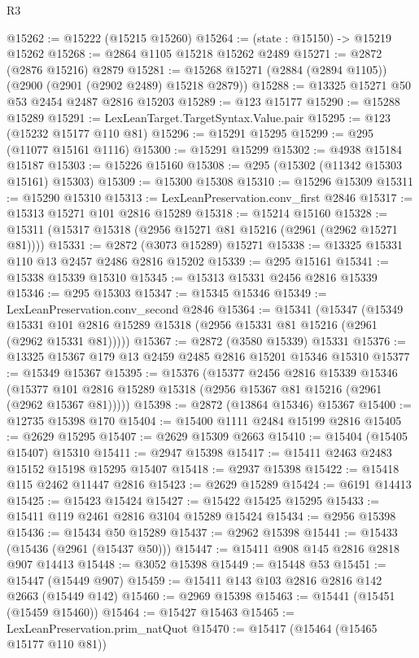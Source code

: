 \begin{lexlean}{R3}
\begin{coremodule}
@15262 := @15222 (@15215 @15260)
@15264 := (state : @15150) -> @15219 @15262
@15268 := @2864 @1105 @15218 @15262 @2489
@15271 := @2872 (@2876 @15216) @2879
@15281 := @15268 @15271 (@2884 (@2894 @1105)) (@2900 (@2901 (@2902 @2489) @15218 @2879))
@15288 := @13325 @15271 @50 @53 @2454 @2487 @2816 @15203
@15289 := @123 @15177
@15290 := @15288 @15289
@15291 := LexLeanTarget.TargetSyntax.Value.pair
@15295 := @123 (@15232 @15177 @110 @81)
@15296 := @15291 @15295
@15299 := @295 (@11077 @15161 @1116)
@15300 := @15291 @15299
@15302 := @4938 @15184 @15187
@15303 := @15226 @15160
@15308 := @295 (@15302 (@11342 @15303 @15161) @15303)
@15309 := @15300 @15308
@15310 := @15296 @15309
@15311 := @15290 @15310
@15313 := LexLeanPreservation.conv_first @2846
@15317 := @15313 @15271 @101 @2816 @15289
@15318 := @15214 @15160
@15328 := @15311 (@15317 @15318 (@2956 @15271 @81 @15216 (@2961 (@2962 @15271 @81))))
@15331 := @2872 (@3073 @15289) @15271
@15338 := @13325 @15331 @110 @13 @2457 @2486 @2816 @15202
@15339 := @295 @15161
@15341 := @15338 @15339 @15310
@15345 := @15313 @15331 @2456 @2816 @15339
@15346 := @295 @15303
@15347 := @15345 @15346
@15349 := LexLeanPreservation.conv_second @2846
@15364 := @15341
    (@15347
      (@15349 @15331 @101 @2816 @15289 @15318 (@2956 @15331 @81 @15216 (@2961 (@2962 @15331 @81)))))
@15367 := @2872 (@3580 @15339) @15331
@15376 := @13325 @15367 @179 @13 @2459 @2485 @2816 @15201 @15346 @15310
@15377 := @15349 @15367
@15395 := @15376
    (@15377
      @2456
      @2816
      @15339
      @15346
      (@15377 @101 @2816 @15289 @15318 (@2956 @15367 @81 @15216 (@2961 (@2962 @15367 @81)))))
@15398 := @2872 (@13864 @15346) @15367
@15400 := @12735 @15398 @170
@15404 := @15400 @1111 @2484 @15199 @2816
@15405 := @2629 @15295
@15407 := @2629 @15309 @2663
@15410 := @15404 (@15405 @15407) @15310
@15411 := @2947 @15398
@15417 := @15411 @2463 @2483 @15152 @15198 @15295 @15407
@15418 := @2937 @15398
@15422 := @15418 @115 @2462 @11447 @2816
@15423 := @2629 @15289
@15424 := @6191 @14413
@15425 := @15423 @15424
@15427 := @15422 @15425 @15295
@15433 := @15411 @119 @2461 @2816 @3104 @15289 @15424
@15434 := @2956 @15398
@15436 := @15434 @50 @15289
@15437 := @2962 @15398
@15441 := @15433 (@15436 (@2961 (@15437 @50)))
@15447 := @15411 @908 @145 @2816 @2818 @907 @14413
@15448 := @3052 @15398
@15449 := @15448 @53
@15451 := @15447 (@15449 @907)
@15459 := @15411 @143 @103 @2816 @2816 @142 @2663 (@15449 @142)
@15460 := @2969 @15398
@15463 := @15441 (@15451 (@15459 @15460))
@15464 := @15427 @15463
@15465 := LexLeanPreservation.prim_natQuot
@15470 := @15417 (@15464 (@15465 @15177 @110 @81))

\end{coremodule}
\end{lexlean}
